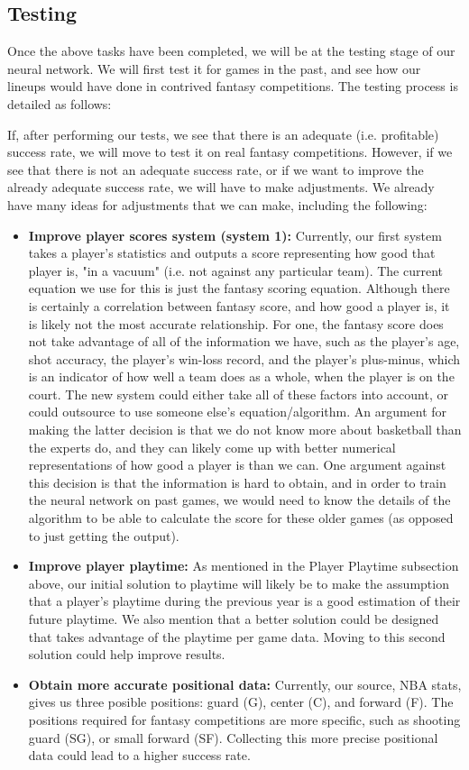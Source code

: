 \subsection{Testing}
Once the above tasks have been completed, we will be at the testing stage of our neural network. We will first test it for games in the past, and see how our lineups would have done in contrived fantasy competitions. The testing process is detailed as follows:

If, after performing our tests, we see that there is an adequate (i.e. profitable) success rate, we will move to test it on real fantasy competitions. However, if we see that there is not an adequate success rate, or if we want to improve the already adequate success rate, we will have to make adjustments. We already have many ideas for adjustments that we can make, including the following:
\begin{itemize}
\item \textbf{Improve player scores system (system 1):} Currently, our first system takes a player's statistics and outputs a score representing how good that player is, "in a vacuum" (i.e. not against any particular team). The current equation we use for this is just the fantasy scoring equation. Although there is certainly a correlation between fantasy score, and how good a player is, it is likely not the most accurate relationship. For one, the fantasy score does not take advantage of all of the information we have, such as the player's age, shot accuracy, the player's win-loss record, and the player's plus-minus, which is an indicator of how well a team does as a whole, when the player is on the court. The new system could either take all of these factors into account, or could outsource to use someone else's equation/algorithm. An argument for making the latter decision is that we do not know more about basketball than the experts do, and they can likely come up with better numerical representations of how good a player is than we can. One argument against this decision is that the information is hard to obtain, and in order to train the neural network on past games, we would need to know the details of the algorithm to be able to calculate the score for these older games (as opposed to just getting the output).
\item \textbf{Improve player playtime:} As mentioned in the Player Playtime subsection above, our initial solution to playtime will likely be to make the assumption that a player's playtime during the previous year is a good estimation of their future playtime. We also mention that a better solution could be designed that takes advantage of the playtime per game data. Moving to this second solution could help improve results.
\item \textbf{Obtain more accurate positional data:} Currently, our source, NBA stats, gives us three posible positions: guard (G), center (C), and forward (F). The positions required for fantasy competitions are more specific, such as shooting guard (SG), or small forward (SF). Collecting this more precise positional data could lead to a higher success rate.
\end{itemize}

